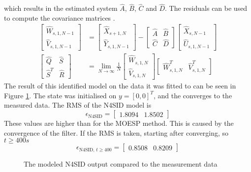 which results in the estimated system $\hat{A}$, $\hat{B}$, $\hat{C}$ and $\hat{D}$. The residuals can be used to compute the covariance matrices \cite[p.~333]{FilteringIdentification}.
\begin{align*}
    \begin{bmatrix} \hat{W}_{s,1,N-1} \\ \hat{V}_{s,1,N-1} \end{bmatrix} &= \begin{bmatrix} \hat{X}_{s+1,N} \\ \hat{Y}_{s,1,N-1} \end{bmatrix} - \begin{bmatrix} \hat{A} & \hat{B}\\ \hat{C} & \hat{D} \end{bmatrix} \begin{bmatrix} \hat{X}_{s,N-1} \\ \hat{U}_{s,1,N-1} \end{bmatrix} \\
    \begin{bmatrix} \hat{Q} & \hat{S}\\ \hat{S}^T & \hat{R} \end{bmatrix} &= \lim_{N \xrightarrow{}\infty} \frac{1}{N} \begin{bmatrix} \hat{W}_{s,1,N} \\ \hat{V}_{s,1,N} \end{bmatrix} \begin{bmatrix} \hat{W}_{s,1,N}^T & \hat{V}_{s,1,N}^T \end{bmatrix}
\end{align*}
The result of this identified model on the data it was fitted to can be seen in Figure \ref{fig:compN4SID}. The state was initialised on $y=[0, 0]^T$, and the converges to the measured data. The RMS of the N4SID model is
$$
\epsilon_{\text{N4SID}} = \begin{bmatrix} 1.8094 & 1.8502 \end{bmatrix}
$$
These values are higher than for the MOESP method. This is caused by the convergence of the filter. If the RMS is taken, starting after converging, so $t\geq400s$
$$
\epsilon_{\text{N4SID, }t\geq400} = \begin{bmatrix} 0.8508 & 0.8209 \end{bmatrix}
$$ 
\begin{figure}
    \centering
    
    \caption{The modeled N4SID output compared to the measurement data}
    \label{fig:compN4SID}
\end{figure}


     
